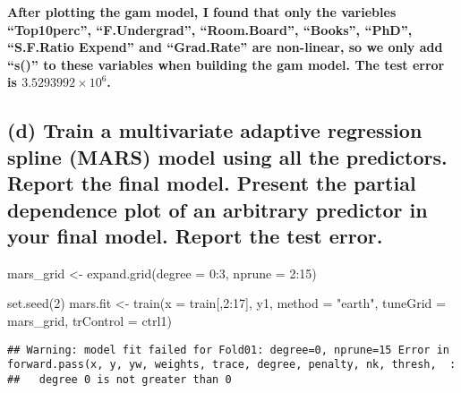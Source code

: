 \documentclass[
]{article}
\newenvironment{Shaded}{\begin{snugshade}}{\end{snugshade}}
\newcommand{\AttributeTok}[1]{\textcolor[rgb]{0.77,0.63,0.00}{#1}}
\newcommand{\DecValTok}[1]{\textcolor[rgb]{0.00,0.00,0.81}{#1}}
\newcommand{\FunctionTok}[1]{\textcolor[rgb]{0.00,0.00,0.00}{#1}}
\newcommand{\NormalTok}[1]{#1}
\newcommand{\OtherTok}[1]{\textcolor[rgb]{0.56,0.35,0.01}{#1}}
\newcommand{\SpecialCharTok}[1]{\textcolor[rgb]{0.00,0.00,0.00}{#1}}
\newcommand{\StringTok}[1]{\textcolor[rgb]{0.31,0.60,0.02}{#1}}
\begin{document}
\textbf{After plotting the gam model, I found that only the variebles
``Top10perc'', ``F.Undergrad'', ``Room.Board'', ``Books'', ``PhD'',
``S.F.Ratio Expend'' and ``Grad.Rate'' are non-linear, so we only add
``s()'' to these variables when building the gam model. The test error
is \ensuremath{3.5293992\times 10^{6}}.}

\hypertarget{d-train-a-multivariate-adaptive-regression-spline-mars-model-using-all-the-predictors.-report-the-final-model.-present-the-partial-dependence-plot-of-an-arbitrary-predictor-in-your-final-model.-report-the-test-error.}{%
\subsection{(d) Train a multivariate adaptive regression spline (MARS)
model using all the predictors. Report the final model. Present the
partial dependence plot of an arbitrary predictor in your final model.
Report the test
error.}\label{d-train-a-multivariate-adaptive-regression-spline-mars-model-using-all-the-predictors.-report-the-final-model.-present-the-partial-dependence-plot-of-an-arbitrary-predictor-in-your-final-model.-report-the-test-error.}}

\begin{Shaded}
\begin{Highlighting}[]
\NormalTok{mars\_grid }\OtherTok{\textless{}{-}} \FunctionTok{expand.grid}\NormalTok{(}\AttributeTok{degree =} \DecValTok{0}\SpecialCharTok{:}\DecValTok{3}\NormalTok{, }
                         \AttributeTok{nprune =} \DecValTok{2}\SpecialCharTok{:}\DecValTok{15}\NormalTok{)}

\FunctionTok{set.seed}\NormalTok{(}\DecValTok{2}\NormalTok{)}
\NormalTok{mars.fit }\OtherTok{\textless{}{-}} \FunctionTok{train}\NormalTok{(}\AttributeTok{x =}\NormalTok{ train[,}\DecValTok{2}\SpecialCharTok{:}\DecValTok{17}\NormalTok{], }
\NormalTok{                  y1,}
                  \AttributeTok{method =} \StringTok{"earth"}\NormalTok{,}
                  \AttributeTok{tuneGrid =}\NormalTok{ mars\_grid,}
                  \AttributeTok{trControl =}\NormalTok{ ctrl1)}
\end{Highlighting}
\end{Shaded}

\begin{verbatim}
## Warning: model fit failed for Fold01: degree=0, nprune=15 Error in forward.pass(x, y, yw, weights, trace, degree, penalty, nk, thresh,  : 
##   degree 0 is not greater than 0
\end{verbatim}
\end{document}
